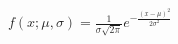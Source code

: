 \documentclass[preview]{standalone}
\begin{document}
\begin{align*}
f(x;\mu,\sigma) = \frac{1}{\sigma\sqrt{2\pi}} e^{-\frac{(x-\mu)^2}{2\sigma^2}}
\end{align*}
\end{document}
